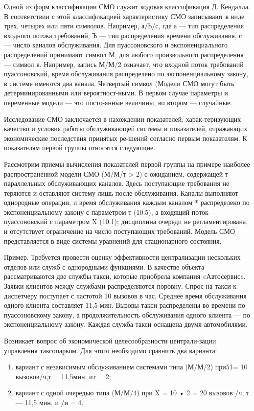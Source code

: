 Одной из форм классификации СМО служит кодовая классификация Д. Кендалла. В соответствии с этой классификацией характеристику СМО записывают в виде трех, четырех или пяти символов. Например, а/Ь/с, где а — тип распределения входного потока требований, Ъ — тип распределения времени обслуживания, с — число каналов обслуживания. Для пуассоновского и экспоненциального распределений принимают символ М, для любого произвольного распределения — символ в. Например, запись М/М/2 означает, что входной поток требований пуассоновский, время обслуживания распределено по экспоненциальному закону, в системе имеются два канала. Четвертый символ (Модели СМО могут быть детерминированными или вероятност-ными. В первом случае параметры и переменные модели — это посто-янные величины, во втором — случайные.

Исследование СМО заключается в нахождении показателей, харак-теризующих качество и условия работы обслуживающей системы и показателей, отражающих экономические последствия принятых ре-шений согласно первым показателям. К показателям первой группы относятся следующие.

Рассмотрим приемы вычисления показателей первой группы на примере наиболее распространенной модели СМО (М/М/т > 2) с ожиданием, содержащей т параллельных обслуживающих каналов. Здесь поступающие требования не теряются и оставляют систему лишь после обслуживания. Каналы выполняют однородные операции, и время обслуживания каждым каналом * распределено по экспоненциальному закону с параметром т (10.5), а входящий поток — пуассоновский с параметром X (10.1); дисциплина очереди не регламентирована, и отсутствует ограничение на число поступающих требований. Модель СМО представляется в виде системы уравнений для стационарного состояния.

Пример. Требуется провести оценку эффективности централизации нескольких отделов или служб с однородными функциями. В качестве объекта рассматриваются две службы такси, которые приобрела компания «Автосервис». Заявки клиентов между службами распределяются поровну. Спрос на такси к диспетчеру поступает с частотой 10 вызовов в час. Среднее время обслуживания одного клиента составляет 11,5 мин. Вызовы такси распределены во времени по пуассоновскому закону, а продолжительность обслуживания одного клиента — по экспоненциальному закону. Каждая служба такси оснащена двумя автомобилями.

Возникает вопрос об экономической целесообразности централи-зации управления таксопарком. Для этого необходимо сравнить два варианта:
\begin{enumerate}
	\item вариант с независимым обслуживанием системами типа (М/М/2) при51= 10 вызовов/ч,т = 11,5мин. ит = 2;
	\item вариант с одной очередью типа (М/М/4) при X = 10 • 2 = 20 вызовов /ч, т — 11,5 мин. и /и = 4.
\end{enumerate}

